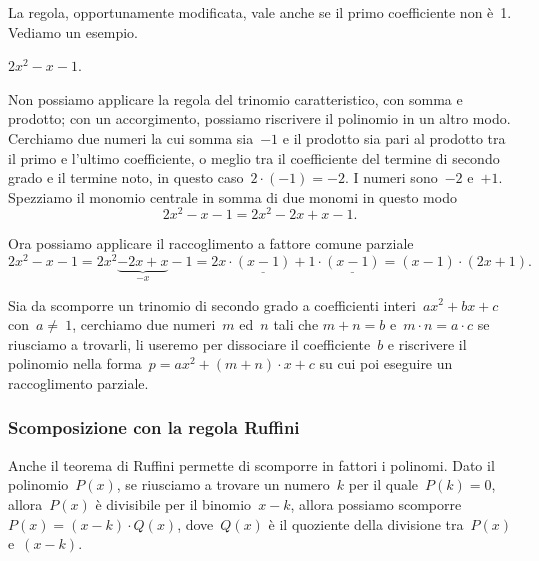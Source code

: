 La regola, opportunamente modificata, vale anche se il primo
coefficiente non è~1. Vediamo un esempio.

 \begin{esempio}
 $2x^{2}-x-1$.

Non possiamo applicare la regola del trinomio caratteristico, con somma
e prodotto; con un accorgimento, possiamo riscrivere il polinomio in un
altro modo. Cerchiamo due numeri la cui somma sia~$-1$ e il prodotto sia
pari al prodotto tra il primo e l'ultimo coefficiente,
o meglio tra il coefficiente del termine di secondo grado e il termine
noto, in questo caso~$2\cdot (-1)=-2$. I numeri sono~$-2$ e~$+1$.
Spezziamo il monomio centrale in somma di due monomi in questo modo
\[2x^{2}-x-1=2x^{2}-2x+x-1.\]

Ora possiamo applicare il raccoglimento a fattore comune parziale
\[2x^{2}-x-1=2x^{2}\underbrace{-2x+x}_{-x}-1=2x\cdot
\underline{{(x-1)}}+1\cdot
\underline{{(x-1)}}=\left(x-1\right)\cdot \left(2x+1\right).\]
 \end{esempio}

\begin{procedura}
Sia da scomporre un trinomio di secondo grado a coefficienti 
interi~$ax^{2}+bx+c$
con~$a\neq~1$, cerchiamo due numeri~$m$ ed~$n$ tali che  $m+n=b$ e~$m\cdot 
n=a\cdot c$
se riusciamo a trovarli, li useremo per dissociare
il coefficiente~$b$ e riscrivere il polinomio nella 
forma~$p=ax^{2}+\left(m+n\right)\cdot x+c$
su cui poi eseguire un raccoglimento parziale.
\end{procedura}


\subsubsection{Scomposizione con la regola Ruffini}
\label{subsubsec:divpol_scompruff}

Anche il teorema di Ruffini permette di scomporre in fattori i polinomi.
Dato il polinomio~$P(x)$, se riusciamo a trovare un numero~$k$
per il quale~$P(k)=0$, allora~$P(x)$ è divisibile per il binomio~$x-k$, 
allora possiamo scomporre~$P(x)=(x-k)\cdot Q(x)$, dove~$Q(x)$
è il quoziente della divisione tra~$P(x)$ e~$(x-k)$.


